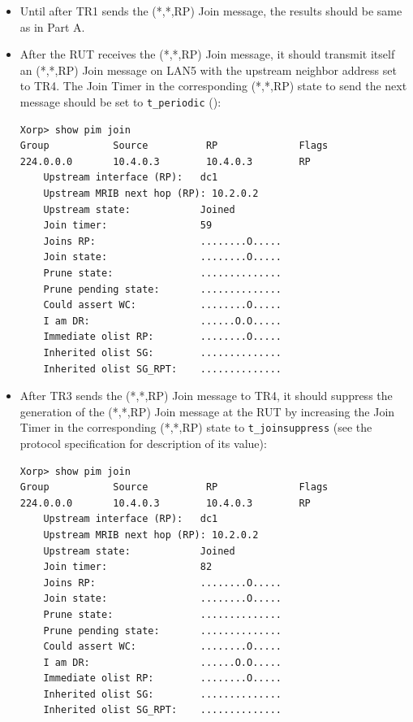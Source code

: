 \documentclass[11pt]{report}
\begin{document}
\begin{itemize}

  \item Until after TR1 sends the (*,*,RP) Join message, the results should be
  same as in Part A.

  \item After the RUT receives the (*,*,RP) Join message, it should
  transmit itself an (*,*,RP) Join message on LAN5 with the upstream
  neighbor address set to TR4. The Join Timer in the corresponding (*,*,RP)
  state to send the next message should be set to \verb=t_periodic=
  ({\PimsmTPeriodic}):

\begin{verbatim}
Xorp> show pim join 
Group           Source          RP              Flags
224.0.0.0       10.4.0.3        10.4.0.3        RP   
    Upstream interface (RP):   dc1
    Upstream MRIB next hop (RP): 10.2.0.2
    Upstream state:            Joined 
    Join timer:                59
    Joins RP:                  ........O.....
    Join state:                ........O.....
    Prune state:               ..............
    Prune pending state:       ..............
    Could assert WC:           ........O.....
    I am DR:                   ......O.O.....
    Immediate olist RP:        ........O.....
    Inherited olist SG:        ..............
    Inherited olist SG_RPT:    ..............
\end{verbatim}

  \item After TR3 sends the (*,*,RP) Join message to TR4, it should suppress
  the generation of the (*,*,RP) Join message at the RUT by increasing the
  Join Timer in the corresponding (*,*,RP) state to \verb=t_joinsuppress=
  (see the protocol specification for description of its value):

\begin{verbatim}
Xorp> show pim join 
Group           Source          RP              Flags
224.0.0.0       10.4.0.3        10.4.0.3        RP   
    Upstream interface (RP):   dc1
    Upstream MRIB next hop (RP): 10.2.0.2
    Upstream state:            Joined 
    Join timer:                82
    Joins RP:                  ........O.....
    Join state:                ........O.....
    Prune state:               ..............
    Prune pending state:       ..............
    Could assert WC:           ........O.....
    I am DR:                   ......O.O.....
    Immediate olist RP:        ........O.....
    Inherited olist SG:        ..............
    Inherited olist SG_RPT:    ..............
\end{verbatim}


\end{itemize}
\end{document}
